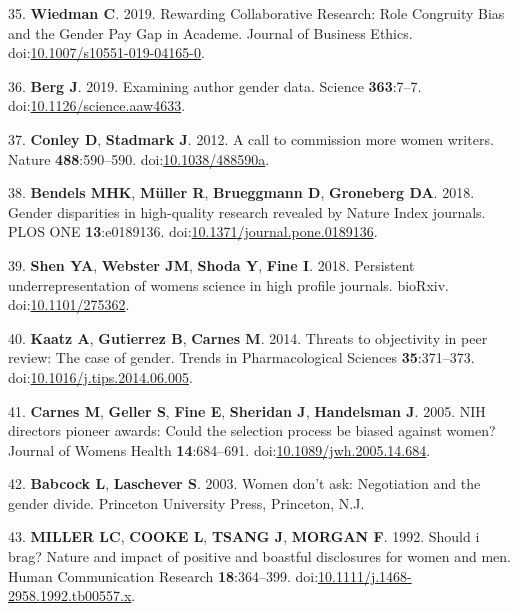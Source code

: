 \documentclass[11pt,]{article}
\begin{document}
\hypertarget{ref-wiedman_rewarding_2019}{}
35. \textbf{Wiedman C}. 2019. Rewarding Collaborative Research: Role
Congruity Bias and the Gender Pay Gap in Academe. Journal of Business
Ethics.
doi:\href{https://doi.org/10.1007/s10551-019-04165-0}{10.1007/s10551-019-04165-0}.

\hypertarget{ref-berg_examining_2019}{}
36. \textbf{Berg J}. 2019. Examining author gender data. Science
\textbf{363}:7--7.
doi:\href{https://doi.org/10.1126/science.aaw4633}{10.1126/science.aaw4633}.

\hypertarget{ref-conley_call_2012-1}{}
37. \textbf{Conley D}, \textbf{Stadmark J}. 2012. A call to commission
more women writers. Nature \textbf{488}:590--590.
doi:\href{https://doi.org/10.1038/488590a}{10.1038/488590a}.

\hypertarget{ref-bendels_gender_2018}{}
38. \textbf{Bendels MHK}, \textbf{Müller R}, \textbf{Brueggmann D},
\textbf{Groneberg DA}. 2018. Gender disparities in high-quality research
revealed by Nature Index journals. PLOS ONE \textbf{13}:e0189136.
doi:\href{https://doi.org/10.1371/journal.pone.0189136}{10.1371/journal.pone.0189136}.

\hypertarget{ref-Shen275362}{}
39. \textbf{Shen YA}, \textbf{Webster JM}, \textbf{Shoda Y},
\textbf{Fine I}. 2018. Persistent underrepresentation of womens science
in high profile journals. bioRxiv.
doi:\href{https://doi.org/10.1101/275362}{10.1101/275362}.

\hypertarget{ref-Kaatz2014}{}
40. \textbf{Kaatz A}, \textbf{Gutierrez B}, \textbf{Carnes M}. 2014.
Threats to objectivity in peer review: The case of gender. Trends in
Pharmacological Sciences \textbf{35}:371--373.
doi:\href{https://doi.org/10.1016/j.tips.2014.06.005}{10.1016/j.tips.2014.06.005}.

\hypertarget{ref-Carnes2005}{}
41. \textbf{Carnes M}, \textbf{Geller S}, \textbf{Fine E},
\textbf{Sheridan J}, \textbf{Handelsman J}. 2005. NIH directors pioneer
awards: Could the selection process be biased against women? Journal of
Womens Health \textbf{14}:684--691.
doi:\href{https://doi.org/10.1089/jwh.2005.14.684}{10.1089/jwh.2005.14.684}.

\hypertarget{ref-babcock_women_2003}{}
42. \textbf{Babcock L}, \textbf{Laschever S}. 2003. Women don't ask:
Negotiation and the gender divide. Princeton University Press,
Princeton, N.J.

\hypertarget{ref-MILLER1992}{}
43. \textbf{MILLER LC}, \textbf{COOKE L}, \textbf{TSANG J},
\textbf{MORGAN F}. 1992. Should i brag? Nature and impact of positive
and boastful disclosures for women and men. Human Communication Research
\textbf{18}:364--399.
doi:\href{https://doi.org/10.1111/j.1468-2958.1992.tb00557.x}{10.1111/j.1468-2958.1992.tb00557.x}.
\end{document}
